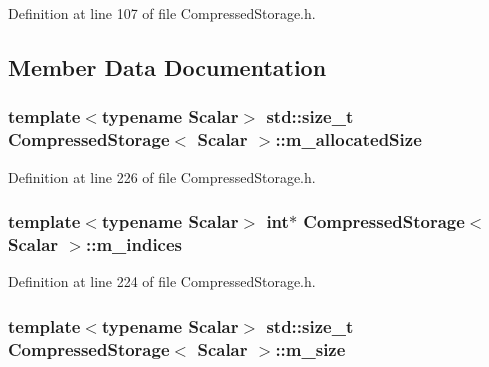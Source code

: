 Definition at line 107 of file Compressed\-Storage.\-h.



\subsection{Member Data Documentation}
\hypertarget{class_compressed_storage_a148d67a091ea24d4f974c27fd14bb6ea}{
\subsubsection[{m\-\_\-allocated\-Size}]{\setlength{\rightskip}{0pt plus 5cm}template$<$typename Scalar$>$ std\-::size\-\_\-t {\bf Compressed\-Storage}$<$ Scalar $>$\-::m\-\_\-allocated\-Size\hspace{0.3cm}{\ttfamily [protected]}}}\label{class_compressed_storage_a148d67a091ea24d4f974c27fd14bb6ea}


Definition at line 226 of file Compressed\-Storage.\-h.

\hypertarget{class_compressed_storage_a12c476ce498110609a741aee3947e8ef}{
\subsubsection[{m\-\_\-indices}]{\setlength{\rightskip}{0pt plus 5cm}template$<$typename Scalar$>$ {\bf int}$\ast$ {\bf Compressed\-Storage}$<$ Scalar $>$\-::m\-\_\-indices\hspace{0.3cm}{\ttfamily [protected]}}}\label{class_compressed_storage_a12c476ce498110609a741aee3947e8ef}


Definition at line 224 of file Compressed\-Storage.\-h.

\hypertarget{class_compressed_storage_a6167d2edee319254f3d3fb2835df1c79}{
\subsubsection[{m\-\_\-size}]{\setlength{\rightskip}{0pt plus 5cm}template$<$typename Scalar$>$ std\-::size\-\_\-t {\bf Compressed\-Storage}$<$ Scalar $>$\-::m\-\_\-size\hspace{0.3cm}{\ttfamily [protected]}}}\label{class_compressed_storage_a6167d2edee319254f3d3fb2835df1c79}


